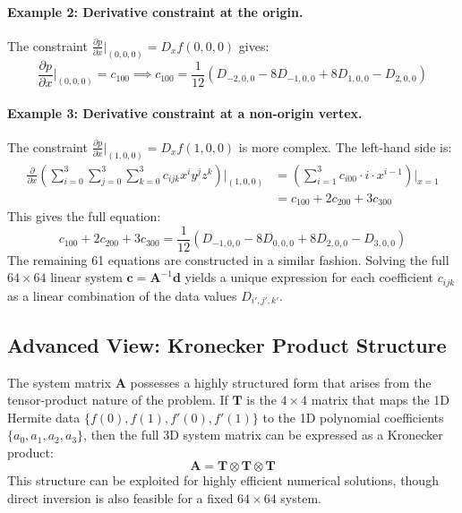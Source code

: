 \documentclass[12pt]{article}
\newcommand{\p}{\partial} %
\newcommand{\mat}[1]{\mathbf{#1}}
\newcommand{\vect}[1]{\mathbf{#1}}
\newcommand{\data}[3]{D_{#1,#2,#3}}
\newcommand{\kron}{\otimes}
\begin{document}
\paragraph{Example 2: Derivative constraint at the origin.}
The constraint $\frac{\p p}{\p x}\big|_{(0,0,0)} = D_x f(0,0,0)$ gives:
\begin{equation}
    \frac{\p p}{\p x}\bigg|_{(0,0,0)} = c_{100} \implies c_{100} = \frac{1}{12} \left( \data{-2}{0}{0} - 8\data{-1}{0}{0} + 8\data{1}{0}{0} - \data{2}{0}{0} \right)
\end{equation}

\paragraph{Example 3: Derivative constraint at a non-origin vertex.}
The constraint $\frac{\p p}{\p x}\big|_{(1,0,0)} = D_x f(1,0,0)$ is more complex. The left-hand side is:
\begin{align}
    \frac{\p}{\p x}\left(\sum_{i=0}^{3} \sum_{j=0}^{3} \sum_{k=0}^{3} c_{ijk} x^i y^j z^k\right)\bigg|_{(1,0,0)} &= \left(\sum_{i=1}^{3} c_{i00} \cdot i \cdot x^{i-1}\right)\bigg|_{x=1} \\
    &= c_{100} + 2c_{200} + 3c_{300}
\end{align}
This gives the full equation:
\begin{equation}
    c_{100} + 2c_{200} + 3c_{300} = \frac{1}{12} \left( \data{-1}{0}{0} - 8\data{0}{0}{0} + 8\data{2}{0}{0} - \data{3}{0}{0} \right)
\end{equation}
The remaining 61 equations are constructed in a similar fashion. Solving the full $64 \times 64$ linear system $\vect{c} = \mat{A}^{-1} \vect{d}$ yields a unique expression for each coefficient $c_{ijk}$ as a linear combination of the data values $\data{i'}{j'}{k'}$.

\subsection{Advanced View: Kronecker Product Structure}
The system matrix $\mat{A}$ possesses a highly structured form that arises from the tensor-product nature of the problem. If $\mat{T}$ is the $4 \times 4$ matrix that maps the 1D Hermite data $\{f(0), f(1), f'(0), f'(1)\}$ to the 1D polynomial coefficients $\{a_0, a_1, a_2, a_3\}$, then the full 3D system matrix can be expressed as a Kronecker product:
\begin{equation}
    \mat{A} = \mat{T} \kron \mat{T} \kron \mat{T}
\end{equation}
This structure can be exploited for highly efficient numerical solutions, though direct inversion is also feasible for a fixed $64 \times 64$ system.
\end{document}

